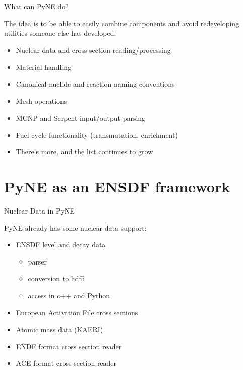 \documentclass[xcolor=x11names,compress]{beamer}
\renewcommand{\(}{\begin{columns}}
\renewcommand{\)}{\end{columns}}
\newcommand{\<}[1]{\begin{column}{#1}}
\renewcommand{\>}{\end{column}}
\begin{document}
\begin{frame}{What can PyNE do?}

    The idea is to be able to easily combine components and avoid redeveloping
    utilities someone else has developed.

    \begin{itemize}
      \item \alert{Nuclear data} and cross-section reading/processing
      \item Material handling
      \item Canonical nuclide and reaction naming conventions
      \item Mesh operations
      \item MCNP and Serpent input/output parsing
      \item Fuel cycle functionality (transmutation, enrichment)
      \item There's more, and the list continues to grow
    \end{itemize}

\end{frame}

\section{PyNE as an ENSDF framework}
\begin{frame}{Nuclear Data in PyNE}

    PyNE already has some nuclear data support:
    \vspace*{1 em}
    \begin{itemize}
      \item ENSDF \alert{level} and \alert{decay} data
      \begin{itemize}
        \item parser
        \item conversion to hdf5
        \item access in c++ and Python
      \end{itemize}
      \item European Activation File cross sections
      \item Atomic mass data (KAERI)
      \item ENDF format cross section reader
      \item ACE format cross section reader
    \end{itemize}
\end{frame}
\end{document}
